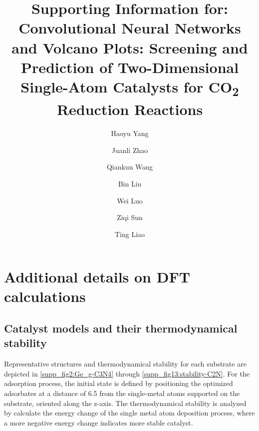 
\title{Supporting Information for:  \\
Convolutional Neural Networks and Volcano Plots:
Screening and Prediction of Two-Dimensional Single-Atom Catalysts for CO\textsubscript{2} Reduction Reactions}

\author[1]{Haoyu Yang}
\author[2]{Juanli Zhao}
\author[3]{Qiankun Wang}
\author[2]{Bin Liu}
\author[4]{Wei Luo}
\author[1,*]{Ziqi Sun}
\author[5,*]{Ting Liao}


\date{}
\maketitle


\newpage
\section{Additional details on DFT calculations}

\subsection{Catalyst models and their thermodynamical stability}
\label{supp_sec2.1_catalysts}

Representative structures and thermodynamical stability for each substrate are
depicted in \cref{supp_fig2:Ge_g-C3N4} through \cref{supp_fig13:stability-C2N}.
For the adsorption process, the initial state is defined by positioning the
optimized adsorbates at a distance of 6.5 \text{\AA} from the single-metal
atoms supported on the substrate, oriented along the z-axis.
The thermodynamical stability is analyzed by calculate the energy change of the
single metal atom deposition process, where a more negative energy change
indicates more stable catalyst.

